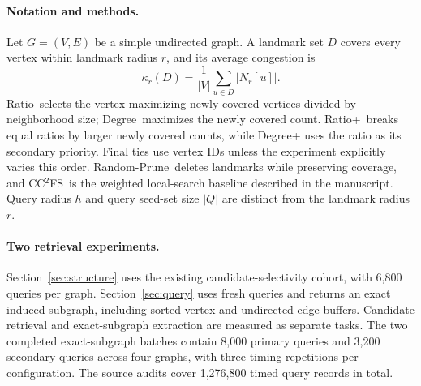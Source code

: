\documentclass[10pt,letterpaper]{article}
\newcommand{\Ratio}{\textsf{Ratio}}
\newcommand{\Rplus}{\textsf{Ratio+}}
\newcommand{\Degree}{\textsf{Degree}}
\newcommand{\Random}{\textsf{Random-Prune}}
\newcommand{\CC}{CC$^2$FS}
\begin{document}
\paragraph{Notation and methods.}
Let $G=(V,E)$ be a simple undirected graph. A landmark set $D$ covers every vertex within landmark radius $r$, and its average congestion is
\[
\kappa_r(D)=\frac{1}{|V|}\sum_{u\in D}|N_r[u]|.
\]
\Ratio\ selects the vertex maximizing newly covered vertices divided by neighborhood size; \Degree\ maximizes the newly covered count. \Rplus\ breaks equal ratios by larger newly covered counts, while Degree+ uses the ratio as its secondary priority. Final ties use vertex IDs unless the experiment explicitly varies this order. \Random\ deletes landmarks while preserving coverage, and \CC\ is the weighted local-search baseline described in the manuscript. Query radius $h$ and query seed-set size $|Q|$ are distinct from the landmark radius $r$.

\paragraph{Two retrieval experiments.}
Section~\ref{sec:structure} uses the existing candidate-selectivity cohort, with 6,800 queries per graph. Section~\ref{sec:query} uses fresh queries and returns an exact induced subgraph, including sorted vertex and undirected-edge buffers. Candidate retrieval and exact-subgraph extraction are measured as separate tasks. The two completed exact-subgraph batches contain 8,000 primary queries and 3,200 secondary queries across four graphs, with three timing repetitions per configuration. The source audits cover 1,276,800 timed query records in total.

\clearpage

\clearpage

\clearpage


\clearpage

\end{document}
